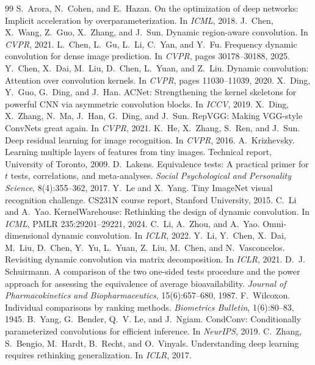 \documentclass[10pt,a4paper]{article}
\begin{document}
\begin{thebibliography}{99}\small
{} S.~Arora, N.~Cohen, and E.~Hazan. On the optimization of deep networks: Implicit acceleration by overparameterization. In \emph{ICML}, 2018.
 J.~Chen, X.~Wang, Z.~Guo, X.~Zhang, and J.~Sun. Dynamic region-aware convolution. In \emph{CVPR}, 2021.
 L.~Chen, L.~Gu, L.~Li, C.~Yan, and Y.~Fu. Frequency dynamic convolution for dense image prediction. In \emph{CVPR}, pages 30178--30188, 2025.
 Y.~Chen, X.~Dai, M.~Liu, D.~Chen, L.~Yuan, and Z.~Liu. Dynamic convolution: Attention over convolution kernels. In \emph{CVPR}, pages 11030--11039, 2020.
 X.~Ding, Y.~Guo, G.~Ding, and J.~Han. ACNet: Strengthening the kernel skeletons for powerful CNN via asymmetric convolution blocks. In \emph{ICCV}, 2019.
 X.~Ding, X.~Zhang, N.~Ma, J.~Han, G.~Ding, and J.~Sun. RepVGG: Making VGG-style ConvNets great again. In \emph{CVPR}, 2021.
 K.~He, X.~Zhang, S.~Ren, and J.~Sun. Deep residual learning for image recognition. In \emph{CVPR}, 2016.
 A.~Krizhevsky. Learning multiple layers of features from tiny images. Technical report, University of Toronto, 2009.
 D.~Lakens. Equivalence tests: A practical primer for $t$ tests, correlations, and meta-analyses. \emph{Social Psychological and Personality Science}, 8(4):355--362, 2017.
 Y.~Le and X.~Yang. Tiny ImageNet visual recognition challenge. CS231N course report, Stanford University, 2015.
 C.~Li and A.~Yao. KernelWarehouse: Rethinking the design of dynamic convolution. In \emph{ICML}, PMLR 235:29201--29221, 2024.
 C.~Li, A.~Zhou, and A.~Yao. Omni-dimensional dynamic convolution. In \emph{ICLR}, 2022.
 Y.~Li, Y.~Chen, X.~Dai, M.~Liu, D.~Chen, Y.~Yu, L.~Yuan, Z.~Liu, M.~Chen, and N.~Vasconcelos. Revisiting dynamic convolution via matrix decomposition. In \emph{ICLR}, 2021.
 D.~J. Schuirmann. A comparison of the two one-sided tests procedure and the power approach for assessing the equivalence of average bioavailability. \emph{Journal of Pharmacokinetics and Biopharmaceutics}, 15(6):657--680, 1987.
 F.~Wilcoxon. Individual comparisons by ranking methods. \emph{Biometrics Bulletin}, 1(6):80--83, 1945.
 B.~Yang, G.~Bender, Q.~V. Le, and J.~Ngiam. CondConv: Conditionally parameterized convolutions for efficient inference. In \emph{NeurIPS}, 2019.
 C.~Zhang, S.~Bengio, M.~Hardt, B.~Recht, and O.~Vinyals. Understanding deep learning requires rethinking generalization. In \emph{ICLR}, 2017.
\end{thebibliography}
\end{document}
